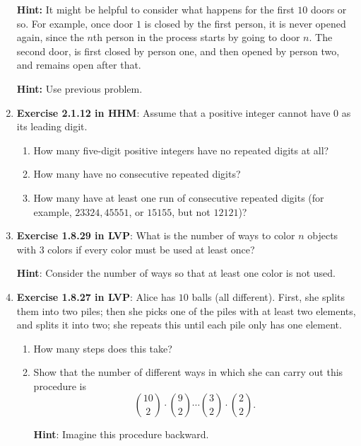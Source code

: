 \documentclass[11pt]{article}
\begin{document}
\begin{enumerate}
\textbf{Hint:} It might be helpful to consider what happens for the first $10$ doors or so.  For example, once door $1$ is closed by the first person, it is never opened again, since the $n$th person in the process starts by going to door $n$.  The second door, is first closed by person one, and then opened by person two, and remains open after that.

\textbf{Hint:} Use previous problem.

\item \textbf{Exercise 2.1.12 in HHM}: Assume that a positive integer cannot have $0$ as its leading digit.
\begin{enumerate}
\item How many five-digit positive integers have no repeated digits at all?

\item How many have no consecutive repeated digits?

\item How many have at least one run of consecutive repeated digits (for example, $23324, 45551$, or $15155$, but not $12121$)?
\end{enumerate}

\item \textbf{Exercise 1.8.29 in LVP}: What is the number of ways to color $n$ objects with $3$ colors if every color must be used at least once?

\textbf{Hint}: Consider the number of ways so that at least one color is not used.


\item \textbf{Exercise 1.8.27 in LVP}:  Alice has $10$ balls (all different).  First, she splits them into two piles; then she picks one of the piles with at least two elements, and splits it into two; she repeats this until each pile only has one element.

\begin{enumerate}
\item How many steps does this take?
\item Show that the number of different ways in which she can carry out this procedure is 
\[ \binom{10}{2}\cdot \binom{9}{2} \cdots \binom{3}{2} \cdot \binom{2}{2}.\]

\textbf{Hint}: Imagine this procedure backward.
\end{enumerate}



\end{enumerate}
\end{document}
